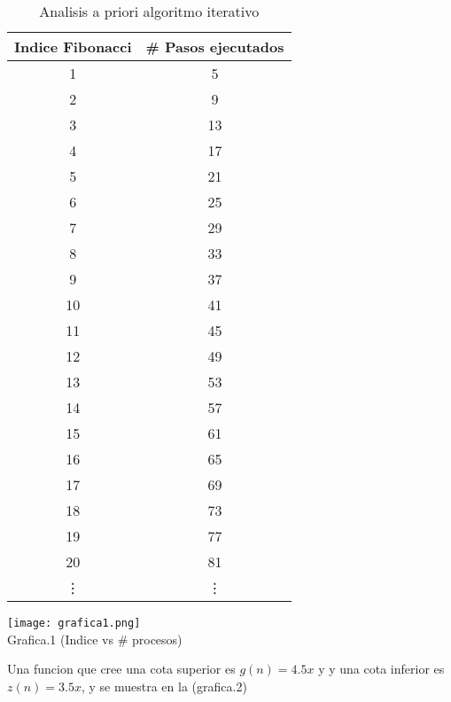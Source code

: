 \documentclass[12pt,twoside]{article}
\begin{document}
\begin{table}[h]
    \centering
    \begin{minipage}{.45\linewidth}
      \centering
      \begin{tabular}{|c|c|}
        \hline
        \textbf{Indice Fibonacci} & \textbf{\# Pasos ejecutados} \\
        \hline

    1	& 5 \\
    2	& 9 \\
    3	& 13 \\
    4	& 17 \\
    5	& 21 \\
    6	& 25 \\
    7	& 29 \\
    8	& 33 \\
    9	& 37 \\
    10	& 41 \\
    11	& 45 \\
    12 & 49 \\
    13 & 53 \\
    14 & 57 \\
    15 & 61 \\
    16 & 65 \\
    17 & 69 \\
    18 & 73 \\
    19 & 77 \\
    20 & 81 \\
    \vdots & \vdots\\
   
        \hline
      \end{tabular}
      \caption{Analisis a priori algoritmo iterativo}
      \label{tab:nombre_etiqueta}
    \end{minipage}
\end{table}

\newpage

\begin{center}
  \begin{minipage}{\linewidth}
    \centering
    \texttt{[image: grafica1.png]}
    \\
    Grafica.1 (Indice vs \# procesos)
\end{minipage}
\end{center}

\newpage

Una funcion que cree una cota superior es $g(n) = 4.5x$ y y una cota inferior es $z(n) = 3.5x$, y se muestra en la (grafica.2)
\end{document}

